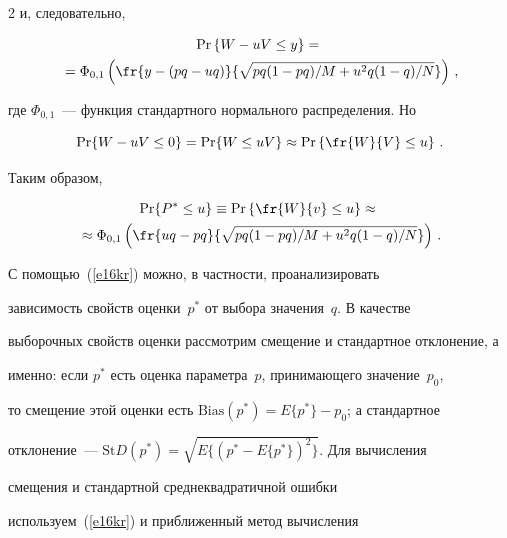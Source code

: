 \begin{multicols}{2}
     и, следовательно, 


     \begin{multline*}


     \mathrm{Pr} \left \{ W-uV\leq y\right \} ={}\\


     {}= \Phi_{0,1}\left ( \fr{y-(pq-


uq)}{\sqrt{pq(1-pq)/M+u^2q(1-q)/N}}\right )\,,


     \end{multline*}


где $\Phi_{0,1}$~--- функция стандартного нормального распределения. Но


$$


\mathrm{Pr}\{W-uV\leq 0\} = \mathrm{Pr}\{W\leq uV\}\approx \mathrm{Pr}\left 


\{\fr{W}{V}\leq u\right \}\,.


$$


Таким образом,


\begin{multline}


\mathrm{Pr}\{P^*\leq u\} \equiv \mathrm{Pr}\left \{\fr{W}{v}\leq u\right 


\}\approx{}\\


{}\approx \Phi_{0,1}\left ( \fr{uq-pq}{\sqrt{pq(1-pq)/M+u^2q(1-


q)/N}}\right )\,.


\label{e16kr}


\end{multline}





    


С помощью~(\ref{e16kr}) можно, в частности, проанализировать 


зависимость свойств оценки~$p^*$ от выбора значения~$q$. В качестве 


выборочных свойств оценки рассмотрим смещение и стандартное отклонение, а 


именно: если $p^*$ есть оценка параметра~$p$, принимающего значение~$p_0$, 


то смещение этой оценки есть $\mathrm{Bias} (p^*) = E\{p^*\} -p_0$; а стандартное 


отклонение~--- $\mathrm{St}D (p^*) =\sqrt{E\{(p^*-E\{p^*\})^2\}}$. Для вычисления 


смещения и стандартной среднеквадратичной ошибки 


используем~(\ref{e16kr}) и приближенный метод вычисления 



\end{multicols}
